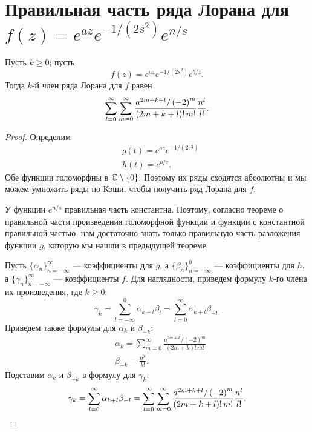 \documentclass[../paper.tex]{subfiles}
\begin{document}
\section{Правильная часть ряда Лорана для $f(z) = e^{az} e^{-1/(2s^2)} e^{n/s}$}
\begin{Th*}
Пусть $k \ge 0$; пусть
\[
    f(z) = e^{az} e^{-1/(2s^2)} e^{b/z}
.\]
Тогда $k$-й член ряда Лорана для $f$ равен
\[
    \sum_{l=0}^{\infty}
    \sum_{m=0}^{\infty} \frac{a^{2m+k+l} / \left( -2 \right)^m}{(2m+k+l)!\,m!} \\
    \frac{n^l}{l!}
.\]
\end{Th*}
\begin{proof}
Определим
\begin{align*}
    & g(t) = e^{az} e^{-1/(2s^2)} \\
    & h(t) = e^{b/z}
.\end{align*}
Обе функции голоморфны в $\mathbb{C} \setminus \{0\}$. Поэтому их ряды сходятся абсолютны и мы можем умножить ряды по Коши, чтобы получить ряд Лорана для $f$.

У функции $e^{n/s}$ правильная часть константна.
Поэтому, согласно теореме о правильной части произведения голоморфной функции и функции с константной правильной частью, 
нам достаточно знать только правильную часть разложения функции $g$, которую мы нашли в предыдущей теореме.

Пусть $\{\alpha_n\}_{n=-\infty}^\infty$ --- коэффициенты для $g$, а $\{\beta_n\}_{n=-\infty}^0$ --- коэффициенты для $h$, а $\{\gamma_n\}_{n=-\infty}^\infty$ --- коэффициенты $f$.
Для наглядности, приведем формулу $k$-го члена их произведения, где $k \ge 0$:
\[
    \gamma_k =
    \sum_{l=-\infty}^{0} \alpha_{k-l} \beta_l =
    \sum_{l=0}^{\infty} \alpha_{k+l} \beta_{-l}
.\]
Приведем также формулы для $\alpha_k$ и $\beta_{-k}$:
\begin{align*}
    & \alpha_k = \sum_{m=0}^{\infty} \frac{a^{2m+k} / \left( -2 \right)^m}{(2m+k)!\,m!} \\
    & \beta_{-k} = \frac{n^k}{k!}
.\end{align*}
Подставим $\alpha_k$ и $\beta_{-k}$ в формулу для $\gamma_k$:
\[
    \gamma_k =
    \sum_{l=0}^{\infty} \alpha_{k+l} \beta_{-l} =
%
    \sum_{l=0}^{\infty}
    \sum_{m=0}^{\infty} \frac{a^{2m+k+l} / \left( -2 \right)^m}{(2m+k+l)!\,m!} \\
    \frac{n^l}{l!}
.\]
\end{proof}
\end{document}
